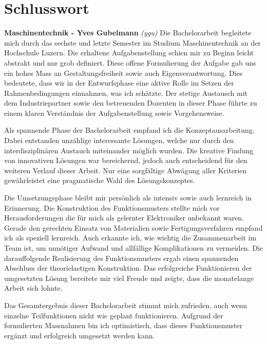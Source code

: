 \newpage
\section{Schlusswort}

\textbf{Maschinentechnik - Yves Gubelmann}
\newline
\textit{(ygu)} Die Bachelorarbeit begleitete mich durch das sechste und letzte Semester im Studium Maschinentechnik an der Hochschule Luzern. Die erhaltene Aufgabenstellung schien mir zu Beginn leicht abstrakt und nur grob definiert. Diese offene Formulierung der Aufgabe gab uns ein hohes Mass an Gestaltungsfreiheit sowie auch Eigenverantwortung. Dies bedeutete, dass wir in der Entwurfsphase eine aktive Rolle im Setzen der Rahmenbedingungen einnahmen, was ich schätzte. Der stetige Austausch mit dem Industriepartner sowie den betreuenden Dozenten in dieser Phase führte zu einem klaren Verständnis der Aufgabenstellung sowie Vorgehensweise.
\newline

Als spannende Phase der Bachelorarbeit empfand ich die Konzeptausarbeitung. Dabei entstanden unzählige interessante Lösungen, welche nur durch den interdisziplinären Austauch miteinander möglich wurden. Die kreative Findung von innovativen Lösungen war bereichernd, jedoch auch entscheidend für den weiteren Verlauf dieser Arbeit. Nur eine sorgfältige Abwägung aller Kriterien gewährleistet eine pragmatische Wahl des Lösungskonzeptes.
\newline

Die Umsetzungsphase bleibt mir persönlich als intensiv sowie auch lernreich in Erinnerung. Die Konstruktion des Funktionsmusters stellte mich vor Herausforderungen die für mich als gelernter Elektroniker unbekannt waren. Gerade den gerechten Einsatz von Materialien sowie Fertigungsverfahren empfand ich als speziell lernreich. Auch erkannte ich, wie wichtig die Zusammenarbeit im Team ist, um unnötiger Aufwand und allfällige Komplikationen zu vermeiden. Die darauffolgende Realisierung des Funktionsmusters ergab einen spannenden Abschluss der theorielastigen Konstruktion. Das erfolgreiche Funktionieren der umgesetzten Lösung bereitete mir viel Freude und zeigte, dass die monatelange Arbeit sich lohnte.
\newline

Das Gesamtergebnis dieser Bachelorarbeit stimmt mich zufrieden, auch wenn einzelne Teilfunktionen nicht wie geplant funktionieren. Aufgrund der formulierten Massnahmen bin ich optimistisch, dass dieses Funktionsmuster ergänzt und erfolgreich umgesetzt werden kann.
\newline

